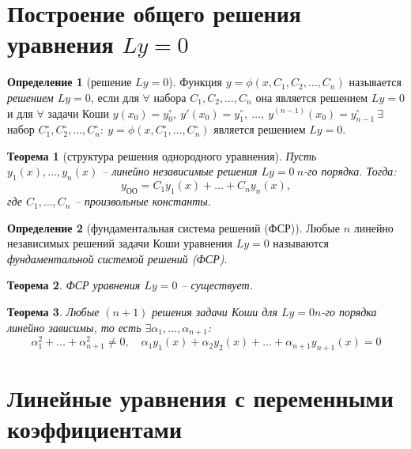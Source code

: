 \documentclass[11pt,a4paper,oneside]{report}
\theoremstyle{definition}
\newtheorem{definition}{Определение}[section]
\theoremstyle{plain}
\newtheorem{theorem}{Теорема}[section]
\theoremstyle{remark}
\begin{document}
\section{Построение общего решения уравнения $Ly = 0$}

\begin{definition}[решение $Ly=0$]
    Функция $y = \phi(x,C_1,C_2,\ldots,C_n)$ называется \emph{решением $Ly = 0$}, если для $\forall$ набора $C_1,C_2,\ldots,C_n$ она является решением $Ly = 0$ и для $\forall$ задачи Коши $y(x_0) = y_0^\circ, \ y'(x_0) = y_1^\circ, \ \ldots, \ y^{(n-1)}(x_0) = y_{n-1}^\circ \ \exists$ набор $C_1^\circ,C_2^\circ,\ldots,C_n^\circ: \ y = \phi(x,C_1^\circ,\ldots,C_n^\circ)$ является решением $Ly = 0$.
\end{definition}

\begin{theorem}[структура решения однородного уравнения]
    Пусть $y_1(x),\ldots,y_n(x)$ -- линейно независимые решения $Ly=0 \ n$-го порядка. Тогда:
    \begin{equation*}
        y_{\text{ОО}} = C_1y_1(x) + \ldots + C_ny_n(x),
    \end{equation*}
    где $C_1,\ldots,C_n$ -- произвольные константы.
\end{theorem}

\begin{definition}[фундаментальная система решений (ФСР)]
    Любые $n$ линейно независимых решений задачи Коши уравнения $Ly=0$ называются \emph{фундаментальной системой решений (ФСР)}.
\end{definition}

\begin{theorem}
    ФСР уравнения $Ly=0$ -- существует.
\end{theorem}

\begin{theorem}
    Любые $(n+1)$ решения задачи Коши для $Ly = 0 n$-го порядка линейно зависимы, то есть $\exists \alpha_1,\ldots,\alpha_{n+1}$:
    \begin{equation*}
        \alpha_1^2 + \ldots + \alpha_{n+1}^2 \ne 0, \quad \alpha_1y_1(x) + \alpha_2y_2(x) + \ldots + \alpha_{n+1}y_{n+1}(x) = 0
    \end{equation*}
\end{theorem}

\section{Линейные уравнения с переменными коэффициентами}
\end{document}

